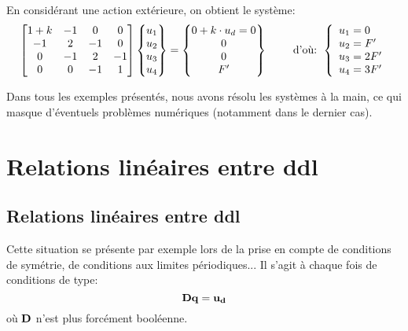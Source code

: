 \medskipvm
En considérant une action extérieure, on obtient le système:
\begin{equation}
\MM*{1+k & -1 & 0 & 0 \\ -1 & 2 & -1 & 0 \\ 0 & -1 & 2 & -1\\ 0&0&-1&1}
\VV*{u_1\\u_2\\u_3\\u_4}
=
\VV*{0+k\cdot u_d = 0\\0\\0\\F'}
\qquad \text{ d'où: } 
\left\{\begin{array}{l} u_1=0 \\ u_2=F' \\ u_3=2F' \\ u_4=3F' \end{array}\right.
\end{equation}


\medskip
Dans tous les exemples présentés, nous avons résolu les systèmes à la main, ce qui masque d'éventuels
problèmes numériques (notamment dans le dernier cas).

\medskip
\ifVersionAvecExemplesSepares
   \section{Relations linéaires entre ddl}
\else
   \subsection{Relations linéaires entre ddl}
\fi
Cette situation se présente par exemple lors de la prise en compte de conditions de symétrie, de conditions aux limites périodiques... Il s'agit à chaque fois de conditions de type:
\begin{equation}
\MM{D}\VV{q} = \VV{u_d}
\end{equation}
où $\MM{D}$ n'est plus forcément booléenne.

